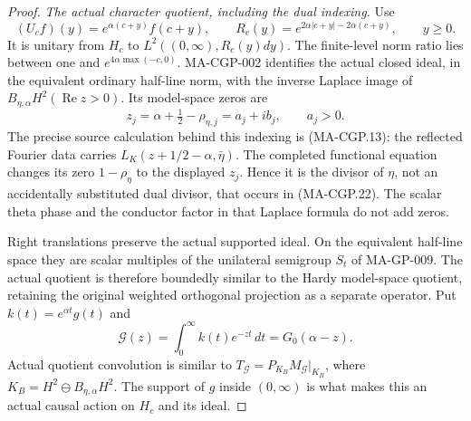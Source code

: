 \begin{proof}
\emph{The actual character quotient, including the dual indexing.}
Use
\[
 (U_cf)(y)=e^{\alpha(c+y)}f(c+y),\qquad
 R_c(y)=e^{2\alpha|c+y|-2\alpha(c+y)},\qquad y\ge0.
 \tag{MA-CGP.25}
\]
It is unitary from $H_c$ to $L^2((0,\infty),R_c(y)dy)$.
The finite-level norm ratio lies between one and
$e^{4\alpha\max(-c,0)}$.  MA-CGP-002 identifies the actual
closed ideal, in the equivalent ordinary half-line norm,
with the inverse Laplace image of
$B_{\eta,\alpha}H^2(\operatorname{Re}z>0)$.
Its model-space zeros are
\[
             z_j=\alpha+\tfrac12-\rho_{\eta,j}=a_j+ib_j,
                              \qquad a_j>0.
 \tag{MA-CGP.26}
\]
The precise source calculation behind this indexing is
(MA-CGP.13): the reflected Fourier data carries
$L_K(z+1/2-\alpha,\bar\eta)$.
The completed functional equation changes its zero $1-\rho_\eta$
to the displayed $z_j$.  Hence it is the divisor of $\eta$,
not an accidentally substituted dual divisor, that occurs
in (MA-CGP.22).
The scalar theta phase and the conductor factor in that
Laplace formula do not add zeros.

Right translations preserve the actual supported ideal.
On the equivalent half-line space they are scalar multiples
of the unilateral semigroup $S_t$ of MA-GP-009.
The actual quotient is therefore boundedly similar to the
Hardy model-space quotient, retaining the original weighted
orthogonal projection as a separate operator.
Put $k(t)=e^{\alpha t}g(t)$ and
\[
        \mathcal G(z)=\int_0^\infty k(t)e^{-zt}\,dt
                                      =G_0(\alpha-z).
 \tag{MA-CGP.27}
\]
Actual quotient convolution is similar to
$T_{\mathcal G}=P_{K_B}M_{\mathcal G}|_{K_B}$,
where $K_B=H^2\ominus B_{\eta,\alpha}H^2$.
The support of $g$ inside $(0,\infty)$ is what makes this
an actual causal action on $H_c$ and its ideal.


\end{proof}
